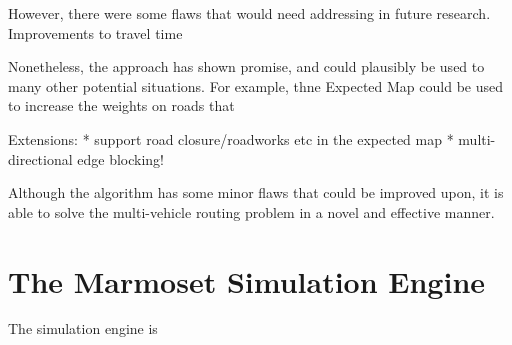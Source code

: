 \documentclass[ %
                    author={Alexander Hill},
                supervisor={Dr. Benjamin Sach},
                    degree={MEng},
                     title={MARMOSET},
                  subtitle={Multi-Agent Route Management using Online Simulation for Efficient Transportation},
                      type={research},
                      year={2016} ]{dissertation}
\begin{document}
However, there were some flaws that would need addressing in future research.
Improvements to travel time

Nonetheless, the approach has shown promise, and could plausibly be used to
many other potential situations. For example, thne Expected Map could be used to
increase the weights on roads that

Extensions:
* support road closure/roadworks etc in the expected map
* multi-directional edge blocking!

Although the algorithm has some minor flaws that could be improved upon, it is
able to solve the multi-vehicle routing problem in a novel and effective manner.

\section{The Marmoset Simulation Engine}

The simulation engine is




\end{document}
